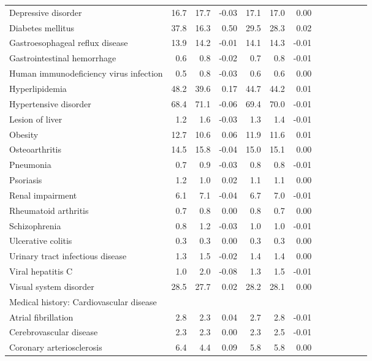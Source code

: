 \documentclass[11pt,]{article}
\begin{document}
\begin{longtable}{lrrrrrrrrrrrr}
      Depressive disorder & 16.7 & 17.7 & -0.03 & 17.1 & 17.0 &  0.00 \\ 
      Diabetes mellitus & 37.8 & 16.3 &  0.50 & 29.5 & 28.3 &  0.02 \\ 
      Gastroesophageal reflux disease & 13.9 & 14.2 & -0.01 & 14.1 & 14.3 & -0.01 \\ 
      Gastrointestinal hemorrhage &  0.6 &  0.8 & -0.02 &  0.7 &  0.8 & -0.01 \\ 
      Human immunodeficiency virus infection &  0.5 &  0.8 & -0.03 &  0.6 &  0.6 &  0.00 \\ 
      Hyperlipidemia & 48.2 & 39.6 &  0.17 & 44.7 & 44.2 &  0.01 \\ 
      Hypertensive disorder & 68.4 & 71.1 & -0.06 & 69.4 & 70.0 & -0.01 \\ 
      Lesion of liver &  1.2 &  1.6 & -0.03 &  1.3 &  1.4 & -0.01 \\ 
      Obesity & 12.7 & 10.6 &  0.06 & 11.9 & 11.6 &  0.01 \\ 
      Osteoarthritis & 14.5 & 15.8 & -0.04 & 15.0 & 15.1 &  0.00 \\ 
      Pneumonia &  0.7 &  0.9 & -0.03 &  0.8 &  0.8 & -0.01 \\ 
      Psoriasis &  1.2 &  1.0 &  0.02 &  1.1 &  1.1 &  0.00 \\ 
      Renal impairment &  6.1 &  7.1 & -0.04 &  6.7 &  7.0 & -0.01 \\ 
      Rheumatoid arthritis &  0.7 &  0.8 &  0.00 &  0.8 &  0.7 &  0.00 \\ 
      Schizophrenia &  0.8 &  1.2 & -0.03 &  1.0 &  1.0 & -0.01 \\ 
      Ulcerative colitis &  0.3 &  0.3 &  0.00 &  0.3 &  0.3 &  0.00 \\ 
      Urinary tract infectious disease &  1.3 &  1.5 & -0.02 &  1.4 &  1.4 &  0.00 \\ 
      Viral hepatitis C &  1.0 &  2.0 & -0.08 &  1.3 &  1.5 & -0.01 \\ 
      Visual system disorder & 28.5 & 27.7 &  0.02 & 28.2 & 28.1 &  0.00 \\ 
  Medical history: Cardiovascular disease &    &    &     &    &    &     \\ 
      Atrial fibrillation &  2.8 &  2.3 &  0.04 &  2.7 &  2.8 & -0.01 \\ 
      Cerebrovascular disease &  2.3 &  2.3 &  0.00 &  2.3 &  2.5 & -0.01 \\ 
      Coronary arteriosclerosis &  6.4 &  4.4 &  0.09 &  5.8 &  5.8 &  0.00 \\ 

\end{longtable}
\end{document}
